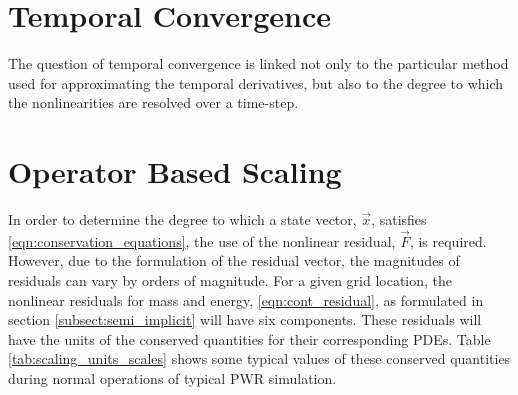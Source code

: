 \section{Temporal Convergence}
\label{sect:temporal_convergence}
The question of temporal convergence is linked not only to the particular method used for approximating the temporal derivatives, but also to the degree to which the nonlinearities are resolved over a time-step. 


\section{Operator Based Scaling}
\label{sect:operator_scaling}
In order to determine the degree to which a state vector, $\vec{x}$, satisfies \eqref{eqn:conservation_equations}, the use of the nonlinear residual, $\vec{F}$, is required.
However, due to the formulation of the residual vector, the magnitudes of residuals can vary by orders of magnitude.
For a given grid location, the nonlinear residuals for mass and energy, \eqref{eqn:cont_residual}, as formulated in section \ref{subsect:semi_implicit} will have six components.
These residuals will have the units of the conserved quantities for their corresponding PDEs.
Table \ref{tab:scaling_units_scales} shows some typical values of these conserved quantities during normal operations of typical PWR simulation.

